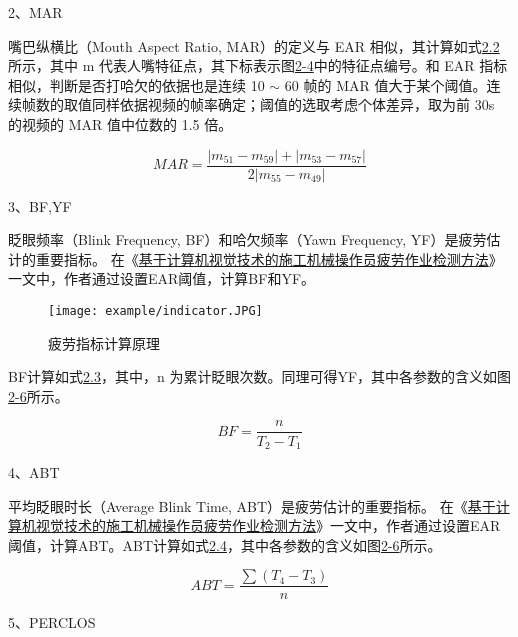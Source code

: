 2、MAR

嘴巴纵横比（Mouth Aspect Ratio, MAR）的定义与 EAR 相似，其计算如式\href{2.2}{2.2}所示，其中 m 代表人嘴特征点，其下标表示图\href{2-4}{2-4}中的特征点编号。和 EAR 指标相似，判断是否打哈欠的依据也是连续 10 $\sim$ 60 帧的 MAR 值大于某个阈值。连续帧数的取值同样依据视频的帧率确定；阈值的选取考虑个体差异，取为前 30s 的视频的 MAR 值中位数的 1.5 倍。

\begin{equation}
MAR = \frac{|m_{51} - m_{59}| + |m_{53} - m_{57}|}{2|m_{55} - m_{49}|}
\end{equation}

3、BF,YF

眨眼频率（Blink Frequency, BF）和哈欠频率（Yawn Frequency, YF）是疲劳估计的重要指标。
在《\href{https://kns.cnki.net/kcms/detail/11.5823.tu.20210201.1703.039.html}{基于计算机视觉技术的施工机械操作员疲劳作业检测方法}》一文中，作者通过设置EAR阈值，计算BF和YF。

\begin{figure}[!htp]

\centering
\texttt{[image: example/indicator.JPG]}
\caption{疲劳指标计算原理}
\label{table:2-6}

\end{figure}

BF计算如式\href{2.3}{2.3}，其中，n 为累计眨眼次数。同理可得YF，其中各参数的含义如图\href{2-6}{2-6}所示。
\begin{center}
\begin{equation}
BF = \frac{n}{T_{2} - T_{1}}
\end{equation}
\end{center}

4、ABT

平均眨眼时长（Average Blink Time, ABT）是疲劳估计的重要指标。
在《\href{https://kns.cnki.net/kcms/detail/11.5823.tu.20210201.1703.039.html}{基于计算机视觉技术的施工机械操作员疲劳作业检测方法}》一文中，作者通过设置EAR阈值，计算ABT。ABT计算如式\href{2.4}{2.4}，其中各参数的含义如图\href{2-6}{2-6}所示。
\begin{center}
\begin{equation}
ABT = \frac{\sum(T_4 - T_3) }{n}
\end{equation}
\end{center}

5、PERCLOS

